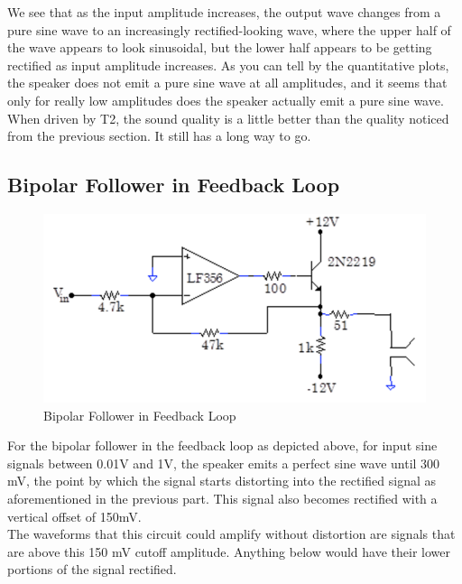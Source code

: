 \documentclass{article}
\begin{document}
    We see that as the input amplitude increases, the output wave changes from a pure sine wave to an increasingly rectified-looking wave, where the upper half of the wave appears to look sinusoidal, but the lower half appears to be getting rectified as input amplitude increases. As you can tell by the quantitative plots, the speaker does not emit a pure sine wave at all amplitudes, and it seems that only for really low amplitudes does the speaker actually emit a pure sine wave. When driven by T2, the sound quality is a little better than the quality noticed from the previous section. It still has a long way to go.

\subsection{Bipolar Follower in Feedback Loop}
    \begin{figure}[H]
        \centering
        \includegraphics[scale = 0.5]{9.png}
        \caption{Bipolar Follower in Feedback Loop \cite{lab8}}
        \label{fig:my_label}
    \end{figure}
    For the bipolar follower in the feedback loop as depicted above, for input sine signals between 0.01V and 1V, the speaker emits a perfect sine wave until 300 mV, the point by which the signal starts distorting into the rectified signal as aforementioned in the previous part. This signal also becomes rectified with a vertical offset of 150mV.\\\indent The waveforms that this circuit could amplify without distortion are signals that are above this 150 mV cutoff amplitude. Anything below would have their lower portions of the signal rectified.

\end{document}

